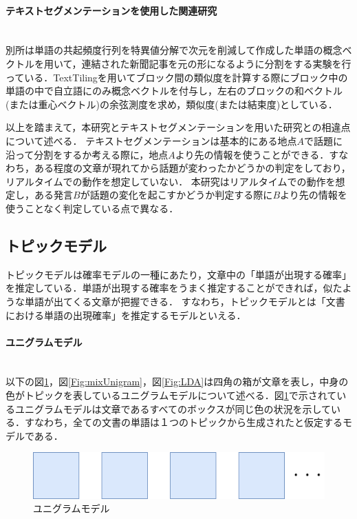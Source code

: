 \paragraph{テキストセグメンテーションを使用した関連研究}\ \\
別所\cite{textSegmentation1}は単語の共起頻度行列を特異値分解で次元を削減して作成した単語の概念ベクトルを用いて，連結された新聞記事を元の形になるように分割をする実験を行っている．TextTilingを用いてブロック間の類似度を計算する際にブロック中の単語の中で自立語にのみ概念ベクトルを付与し，左右のブロックの和ベクトル(または重心ベクトル)の余弦測度を求め，類似度(または結束度)としている．

以上を踏まえて，本研究とテキストセグメンテーションを用いた研究との相違点について述べる．
テキストセグメンテーションは基本的にある地点$A$で話題に沿って分割をするか考える際に，地点$A$より先の情報を使うことができる．すなわち，ある程度の文章が現れてから話題が変わったかどうかの判定をしており，リアルタイムでの動作を想定していない．
本研究はリアルタイムでの動作を想定し，ある発言$B$が話題の変化を起こすかどうか判定する際に$B$より先の情報を使うことなく判定している点で異なる．
%
\subsection{トピックモデル}
トピックモデル\cite{topicModel}は確率モデルの一種にあたり，文章中の「単語が出現する確率」を推定している．単語が出現する確率をうまく推定することができれば，似たような単語が出てくる文章が把握できる．
すなわち，トピックモデルとは「文書における単語の出現確率」を推定するモデルといえる．
\paragraph{ユニグラムモデル}\ \\
以下の図\ref{Fig:unigram}，図\ref{Fig:mixUnigram}，図\ref{Fig:LDA}は四角の箱が文章を表し，中身の色がトピックを表しているユニグラムモデルについて述べる．図\ref{Fig:unigram}で示されているユニグラムモデルは文章であるすべてのボックスが同じ色の状況を示している．すなわち，全ての文書の単語は１つのトピックから生成されたと仮定するモデルである．
\begin{figure}[htbp]
 \begin{center}
  \includegraphics[width=\textwidth]{../images/2.Related_Work/topicModel-unigram.png}
  \caption{ユニグラムモデル}
  \label{Fig:unigram}
  \vspace{-10pt}
 \end{center}
\end{figure}
